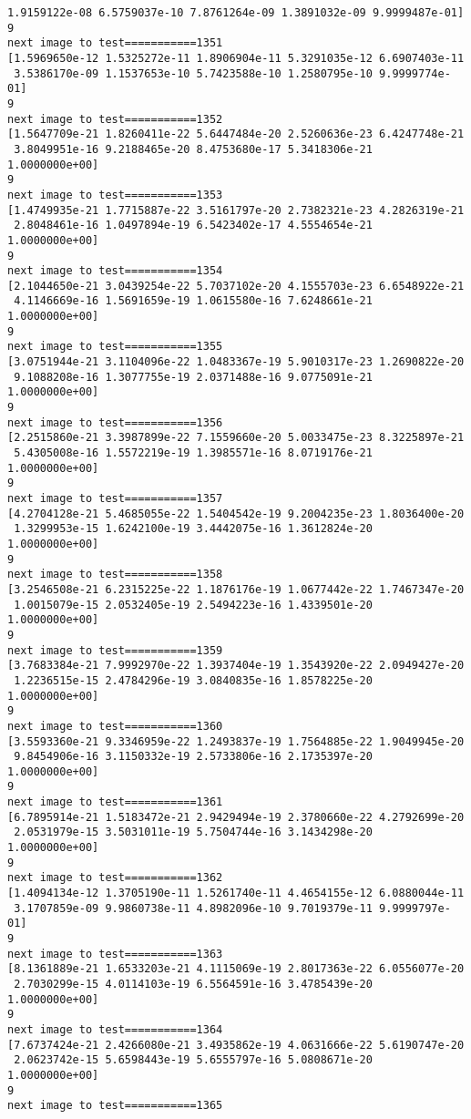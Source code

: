 \documentclass[11pt]{article}
\begin{document}
\begin{Verbatim}[commandchars=\\\{\}]
 1.9159122e-08 6.5759037e-10 7.8761264e-09 1.3891032e-09 9.9999487e-01]
9
next image to test===========1351
[1.5969650e-12 1.5325272e-11 1.8906904e-11 5.3291035e-12 6.6907403e-11
 3.5386170e-09 1.1537653e-10 5.7423588e-10 1.2580795e-10 9.9999774e-01]
9
next image to test===========1352
[1.5647709e-21 1.8260411e-22 5.6447484e-20 2.5260636e-23 6.4247748e-21
 3.8049951e-16 9.2188465e-20 8.4753680e-17 5.3418306e-21 1.0000000e+00]
9
next image to test===========1353
[1.4749935e-21 1.7715887e-22 3.5161797e-20 2.7382321e-23 4.2826319e-21
 2.8048461e-16 1.0497894e-19 6.5423402e-17 4.5554654e-21 1.0000000e+00]
9
next image to test===========1354
[2.1044650e-21 3.0439254e-22 5.7037102e-20 4.1555703e-23 6.6548922e-21
 4.1146669e-16 1.5691659e-19 1.0615580e-16 7.6248661e-21 1.0000000e+00]
9
next image to test===========1355
[3.0751944e-21 3.1104096e-22 1.0483367e-19 5.9010317e-23 1.2690822e-20
 9.1088208e-16 1.3077755e-19 2.0371488e-16 9.0775091e-21 1.0000000e+00]
9
next image to test===========1356
[2.2515860e-21 3.3987899e-22 7.1559660e-20 5.0033475e-23 8.3225897e-21
 5.4305008e-16 1.5572219e-19 1.3985571e-16 8.0719176e-21 1.0000000e+00]
9
next image to test===========1357
[4.2704128e-21 5.4685055e-22 1.5404542e-19 9.2004235e-23 1.8036400e-20
 1.3299953e-15 1.6242100e-19 3.4442075e-16 1.3612824e-20 1.0000000e+00]
9
next image to test===========1358
[3.2546508e-21 6.2315225e-22 1.1876176e-19 1.0677442e-22 1.7467347e-20
 1.0015079e-15 2.0532405e-19 2.5494223e-16 1.4339501e-20 1.0000000e+00]
9
next image to test===========1359
[3.7683384e-21 7.9992970e-22 1.3937404e-19 1.3543920e-22 2.0949427e-20
 1.2236515e-15 2.4784296e-19 3.0840835e-16 1.8578225e-20 1.0000000e+00]
9
next image to test===========1360
[3.5593360e-21 9.3346959e-22 1.2493837e-19 1.7564885e-22 1.9049945e-20
 9.8454906e-16 3.1150332e-19 2.5733806e-16 2.1735397e-20 1.0000000e+00]
9
next image to test===========1361
[6.7895914e-21 1.5183472e-21 2.9429494e-19 2.3780660e-22 4.2792699e-20
 2.0531979e-15 3.5031011e-19 5.7504744e-16 3.1434298e-20 1.0000000e+00]
9
next image to test===========1362
[1.4094134e-12 1.3705190e-11 1.5261740e-11 4.4654155e-12 6.0880044e-11
 3.1707859e-09 9.9860738e-11 4.8982096e-10 9.7019379e-11 9.9999797e-01]
9
next image to test===========1363
[8.1361889e-21 1.6533203e-21 4.1115069e-19 2.8017363e-22 6.0556077e-20
 2.7030299e-15 4.0114103e-19 6.5564591e-16 3.4785439e-20 1.0000000e+00]
9
next image to test===========1364
[7.6737424e-21 2.4266080e-21 3.4935862e-19 4.0631666e-22 5.6190747e-20
 2.0623742e-15 5.6598443e-19 5.6555797e-16 5.0808671e-20 1.0000000e+00]
9
next image to test===========1365

\end{Verbatim}
\end{document}
